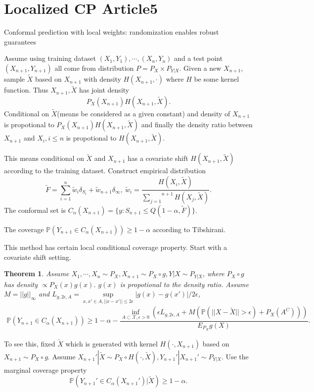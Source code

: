 \documentclass[12pt, a4paper, oneside]{article}
\newtheorem{theorem}{Theorem}[section]
\begin{document}
\section{Localized CP Article5}
    Conformal prediction with local weights: randomization enables robust guarantees\cite{hore2023conformal}


    Assume using training dataset $(X_1,Y_1),\cdots,(X_n,Y_n)$ and a test point $(X_{n+1},Y_{n+1})$ all come from distribution $P=P_X\times P_{Y|X}$. Given a new $X_{n+1}$, sample $\tilde{X}$ based on $X_{n+1}$ with density $H(X_{n+1},\cdot)$ where $H$ be some kernel function. Thus $X_{n+1},\tilde{X}$ has joint density
    \begin{equation*}
        P_X(X_{n+1})H(X_{n+1},\tilde{X}).
    \end{equation*}
    Conditional on $\tilde{X}$(means be considered as a given constant) and density of $X_{n+1}$ is propotional to $P_X(X_{n+1})H(X_{n+1},\tilde{X})$ and finally the density ratio between $X_{n+1}$ and $X_{i},i\leq n$ is propotional to $H(X_{n+1},\tilde{X})$.


    This means conditional on $\tilde{X}$ and $X_{n+1}$ has a covariate shift $H(X_{n+1},\tilde{X})$ according to the training dataset. Construct empirical distribution
    \begin{equation*}
        \tilde{F}=\overset{n}{\underset{i=1}\sum}\tilde{w}_i\delta_{S_i}+\tilde{w}_{n+1}\delta_{\infty},\ \tilde{w}_i=\dfrac{H(X_i,\tilde{X})}{\overset{n+1}{\underset{j=1}\sum}H(X_j,\tilde{X})}.
    \end{equation*}
    The conformal set is $C_\alpha(X_{n+1})=\{y:S_{n+1}\leq Q(1-\alpha,\tilde{F})\}$.


    The coverage $\mathbb{P}(Y_{n+1}\in C_\alpha(X_{n+1}))\geq 1-\alpha$ according to Tibshirani\cite{tibshirani2019conformal}.


    This method has certain local conditional coverage property. Start with a covariate shift setting.
    \begin{theorem}
        Assume $X_1,\cdots,X_n\sim P_X,X_{n+1}\sim P_X\circ g,Y|X\sim P_{Y|X}$, where $P_X\circ g$ has density $\varpropto P_X(x)g(x)$. $g(x)$ is propotional to the density ratio. Assume $M=||g||_\infty$ and $L_{g,2\epsilon,A}=\underset{x,x'\in A,||x-x'||\leq 2\epsilon}{\sup}|g(x)-g(x')|/2\epsilon$,
        \begin{align*}
            \mathbb{P}\left( Y_{n+1}\in C_\alpha(X_{n+1}) \right)\geq 1-\alpha-\dfrac{\underset{A\subset\mathcal{X},\epsilon>0}{\inf}\left( \epsilon L_{g,2\epsilon,A}+M\left( \mathbb{P}\left( ||X-\tilde{X}||>\epsilon \right)+P_X(A^C) \right) \right)}{E_{P_X}g(X)}.
        \end{align*}
    \end{theorem}
    To see this, fixed $\tilde{X}$ which is generated with kernel $H(\cdot,X_{n+1})$ based on $X_{n+1}\sim P_X\circ g$. Assume $X_{n+1}'|\tilde{X}\sim P_X\circ H(\cdot,\tilde{X}),Y_{n+1}'|X_{n+1}'\sim P_{Y|X}$. Use the marginal coverage property
    \begin{equation}
        \mathbb{P}\left( Y_{n+1}'\in C_\alpha(X_{n+1}')\Big|\tilde{X} \right)\geq 1-\alpha.\label{formula1}
    \end{equation}
\end{document}
